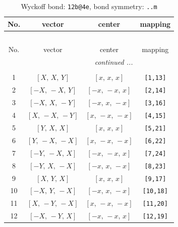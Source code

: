 \documentclass[fleqn,8pt]{jsarticle}
\begin{document}
\begin{longtable}{cccc}
\caption{Wyckoff bond: {\tt 12b@4e}, bond symmetry: {\tt ..m}}
 \\
 \hline \hline
No. & vector & center & mapping \\ \hline \endfirsthead

\multicolumn{3}{l}{\tablename\ \thetable{}} \\
 \hline \hline
No. & vector & center & mapping \\ \hline \endhead

 \hline \hline
\multicolumn{3}{r}{\footnotesize\it continued ...} \\ \endfoot

 \hline \hline
\multicolumn{3}{r}{} \\ \endlastfoot

1 & $\left[ X,\, X,\, Y \right]$ & $\left[ x,\, x,\, x \right]$ & {\tt [1,13]} \\ \hline
2 & $\left[ - X,\, - X,\, Y \right]$ & $\left[ - x,\, - x,\, x \right]$ & {\tt [2,14]} \\ \hline
3 & $\left[ - X,\, X,\, - Y \right]$ & $\left[ - x,\, x,\, - x \right]$ & {\tt [3,16]} \\ \hline
4 & $\left[ X,\, - X,\, - Y \right]$ & $\left[ x,\, - x,\, - x \right]$ & {\tt [4,15]} \\ \hline
5 & $\left[ Y,\, X,\, X \right]$ & $\left[ x,\, x,\, x \right]$ & {\tt [5,21]} \\ \hline
6 & $\left[ Y,\, - X,\, - X \right]$ & $\left[ x,\, - x,\, - x \right]$ & {\tt [6,22]} \\ \hline
7 & $\left[ - Y,\, - X,\, X \right]$ & $\left[ - x,\, - x,\, x \right]$ & {\tt [7,24]} \\ \hline
8 & $\left[ - Y,\, X,\, - X \right]$ & $\left[ - x,\, x,\, - x \right]$ & {\tt [8,23]} \\ \hline
9 & $\left[ X,\, Y,\, X \right]$ & $\left[ x,\, x,\, x \right]$ & {\tt [9,17]} \\ \hline
10 & $\left[ - X,\, Y,\, - X \right]$ & $\left[ - x,\, x,\, - x \right]$ & {\tt [10,18]} \\ \hline
11 & $\left[ X,\, - Y,\, - X \right]$ & $\left[ x,\, - x,\, - x \right]$ & {\tt [11,20]} \\ \hline
12 & $\left[ - X,\, - Y,\, X \right]$ & $\left[ - x,\, - x,\, x \right]$ & {\tt [12,19]} \\
\end{longtable}
\renewcommand{\arraystretch}{1.2}
\end{document}
